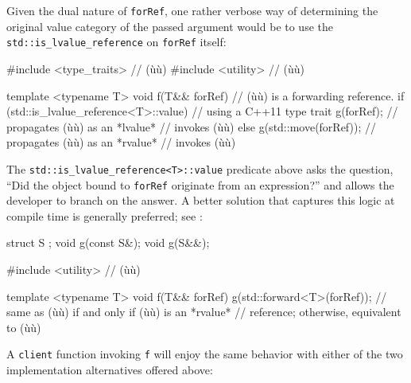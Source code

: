 Given the dual nature of \lstinline!forRef!, one rather verbose way of
determining the original value category of the passed argument would be
to use the \lstinline!std::is_lvalue_reference!  on
\lstinline!forRef! itself:

\begin{emcppslisting}[emcppsbatch=e1]
#include <type_traits>  // (ù{}ù)
#include <utility>  // (ù{}ù)

template <typename T>
void f(T&& forRef)      // (ù{}ù) is a forwarding reference.
{
    if (std::is_lvalue_reference<T>::value)  // using a C++11 type trait
    {
        g(forRef);             // propagates (ù{}ù) as an *lvalue*
    }                          // invokes (ù{}ù)
    else
    {
        g(std::move(forRef));  // propagates (ù{}ù) as an *rvalue*
    }                          // invokes (ù{}ù)
}
\end{emcppslisting}

\noindent The \lstinline!std::is_lvalue_reference<T>::value! predicate above asks
the question, ``Did the object bound to \lstinline!forRef! originate
from an  expression?'' and allows the developer to branch on the
answer. A better solution that captures this logic at compile time is generally preferred; see :

\begin{emcppshiddenlisting}[emcppsbatch=e2]
struct S {};
void g(const S&);
void g(S&&);
\end{emcppshiddenlisting}
\begin{emcppslisting}[emcppsbatch=e2]
#include <utility>  // (ù{}ù)

template <typename T>
void f(T&& forRef)
{
    g(std::forward<T>(forRef));
        // same as (ù{}ù) if and only if (ù{}ù) is an *rvalue*
        // reference; otherwise, equivalent to (ù{}ù)
}
\end{emcppslisting}

\noindent A \lstinline!client! function invoking \lstinline!f! will enjoy the same
behavior with either of the two implementation alternatives offered
above:

